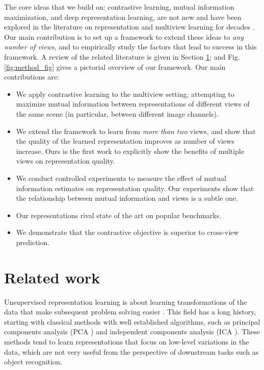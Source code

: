 \documentclass[10pt,twocolumn,letterpaper]{article}
\newcommand{\citep}[1]{\cite{#1}}
\begin{document}
The core ideas that we build on: contrastive learning, mutual information maximization, and deep representation learning, are not new and have been explored in the literature on representation and multiview learning for decades \cite{sa2004sensory,li2018survey,xu2013survey,arora2019theoretical}. Our main contribution is to set up a framework to extend these ideas to \emph{any number of views}, and to empirically study the factors that lead to success in this framework. A review of the related literature is given in Section \ref{sec:related_works}; and Fig. \ref{fig:method_fig} gives a pictorial overview of our framework. Our main contributions are:
\begin{itemize}[noitemsep]
    \item We apply contrastive learning to the multiview setting, attempting to maximize mutual information between representations of different views of the same scene (in particular, between different image channels).
    \item We extend the framework to learn from \emph{more than two} views, and show that the quality of the learned representation improves as number of views increase. Ours is the first work to explicitly show the benefits of multiple views on representation quality.
    \item We conduct controlled experiments to measure the effect of mutual information estimates on representation quality. Our experiments show that the relationship between mutual information and views is a subtle one.
    \item Our representations rival state of the art on popular benchmarks.
    \item We demonstrate that the contrastive objective is superior to cross-view prediction.
\end{itemize}
 \section{Related work}\label{sec:related_works}
\vspace{-5pt}

Unsupervised representation learning is about learning transformations of the data that make subsequent problem solving easier \citep{bengio2013representation}.
This field has a long history, starting with classical methods with well established algorithms, such as principal components analysis (PCA \citep{jolliffe2011principal}) and independent components analysis (ICA \citep{hyvarinen2004independent}). These methods tend to learn representations that focus on low-level variations in the data, which are not very useful from the perspective of downstream tasks such as object recognition.  
\end{document}
